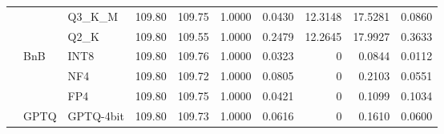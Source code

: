 \begin{table}[t]
{\begin{tabular}{ll l rrrrrrr}
 &  & Q3\_K\_M & 109.80 & 109.75 & 1.0000 & 0.0430 & 12.3148 & 17.5281 & 0.0860 \\
 &  & Q2\_K & 109.80 & 109.55 & 1.0000 & 0.2479 & 12.2645 & 17.9927 & 0.3633 \\
 & BnB & INT8 & 109.80 & 109.76 & 1.0000 & 0.0323 & \cellcolor{cyan!12} $0$ & 0.0844 & 0.0112 \\
 &  & NF4 & 109.80 & 109.72 & 1.0000 & 0.0805 & \cellcolor{cyan!12} $0$ & 0.2103 & 0.0551 \\
 &  & FP4 & 109.80 & 109.75 & 1.0000 & 0.0421 & \cellcolor{cyan!12} $0$ & 0.1099 & 0.1034 \\
 & GPTQ & GPTQ-4bit & 109.80 & 109.73 & 1.0000 & 0.0616 & \cellcolor{cyan!12} $0$ & 0.1610 & 0.0600 \\
\bottomrule
\end{tabular}}
\end{table}